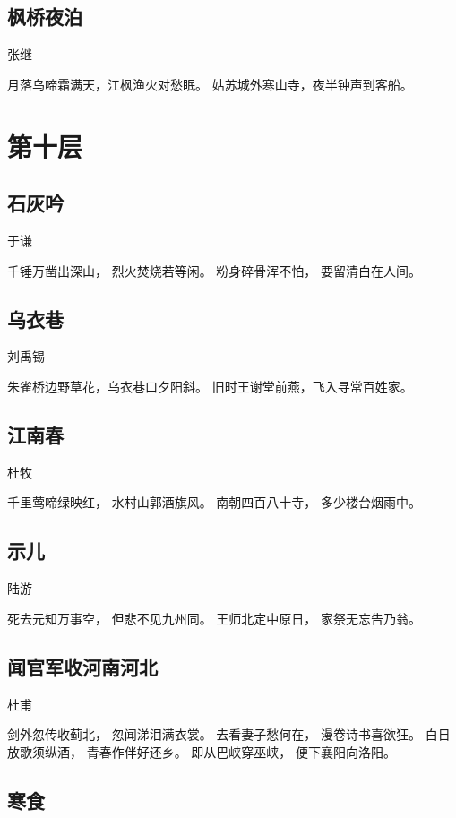 \documentclass[12pt,UTF8]{ctexbook}
\begin{document}
\section{枫桥夜泊}

张继

月落乌啼霜满天，江枫渔火对愁眠。
姑苏城外寒山寺，夜半钟声到客船。

\chapter{第十层}

\section{石灰吟}

于谦

千锤万凿出深山，
烈火焚烧若等闲。
粉身碎骨浑不怕，
要留清白在人间。

\section{乌衣巷}

刘禹锡

朱雀桥边野草花，乌衣巷口夕阳斜。
旧时王谢堂前燕，飞入寻常百姓家。

\section{江南春}

杜牧

千里莺啼绿映红，
水村山郭酒旗风。
南朝四百八十寺，
多少楼台烟雨中。

\section{示儿}

陆游

死去元知万事空，
但悲不见九州同。
王师北定中原日，
家祭无忘告乃翁。

\section{闻官军收河南河北}

杜甫

剑外忽传收蓟北，
忽闻涕泪满衣裳。
去看妻子愁何在，
漫卷诗书喜欲狂。
白日放歌须纵酒，
青春作伴好还乡。
即从巴峡穿巫峡，
便下襄阳向洛阳。

\section{寒食}
\end{document}
